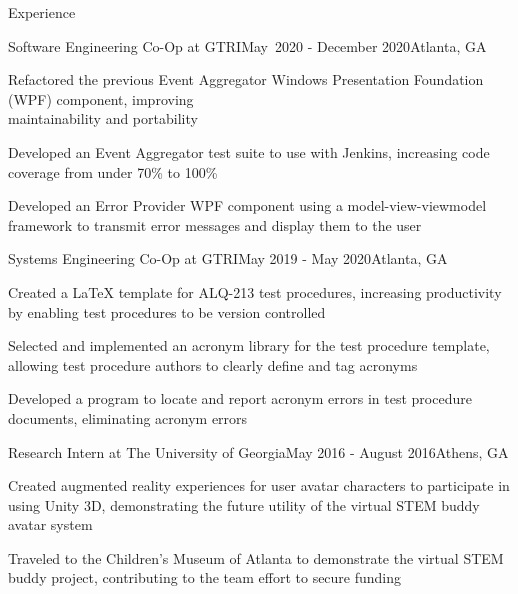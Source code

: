 \documentclass{resume}
\begin{document}
\begin{rSection}{Experience}

	\begin{rSubsection}{Software Engineering Co-Op at GTRI}{May~2020 - December 2020}{}{}{Atlanta, GA}
		\item Refactored the previous Event Aggregator Windows Presentation Foundation (WPF) component, improving \\ maintainability and portability
		\item Developed an Event Aggregator test suite to use with Jenkins, increasing code coverage from under 70\% to 100\%
		\item Developed an Error Provider WPF component using a model-view-viewmodel framework to transmit error messages and display them to the user
	\end{rSubsection} 

	\begin{rSubsection}{Systems Engineering Co-Op at GTRI}{May 2019 - May 2020}{}{}{Atlanta, GA}
		\item Created a LaTeX template for ALQ-213 test procedures, increasing productivity by enabling test procedures to be version controlled
		\item Selected and implemented an acronym library for the test procedure template, allowing test procedure authors to clearly define and tag acronyms
		\item Developed a program to locate and report acronym errors in test procedure documents, eliminating acronym errors
	\end{rSubsection} 

	\begin{rSubsection}{Research Intern at The University of Georgia}{May 2016 - August 2016}{}{}{Athens, GA}
		\item Created augmented reality experiences for user avatar characters to participate in using Unity 3D, demonstrating the future utility of the virtual STEM buddy avatar system
		\item Traveled to the Children’s Museum of Atlanta to demonstrate the virtual STEM buddy project, contributing to the team effort to secure funding
	\end{rSubsection} 

\end{rSection} 
\end{document}

